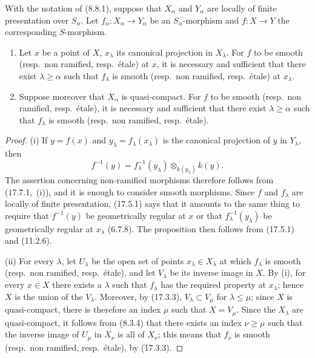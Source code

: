 \begin{proposition}[17.7.8]
\label{IV.17.7.8}
With the notation of (8.8.1), suppose that $X_\alpha$ and $Y_\alpha$ are locally of finite presentation over $S_\alpha$.
Let $f_\alpha:X_\alpha\to Y_\alpha$ be an $S_\alpha$-morphism and $f:X\to Y$ the corresponding $S$-morphism.
\begin{enumerate}[label=(\roman*)]
  \item Let $x$ be a point of $X$, $x_\lambda$ its canonical projection in $X_\lambda$.
  For $f$ to be smooth (resp.\ non ramified, resp.\ \'etale) at $x$, it is necessary and sufficient that there exist $\lambda\geq\alpha$ such that $f_\lambda$ is smooth (resp.\ non ramified, resp.\ \'etale) at $x_\lambda$.
  \item Suppose moreover that $X_\alpha$ is quasi-compact.
  For $f$ to be smooth (resp.\ non ramified, resp.\ \'etale), it is necessary and sufficient that there exist $\lambda\geq\alpha$ such that $f_\lambda$ is smooth (resp.\ non ramified, resp.\ \'etale).
\end{enumerate}
\end{proposition}

\begin{proof}
(i) If $y=f(x)$ and $y_\lambda=f_\lambda(x_\lambda)$ is the canonical projection of $y$ in $Y_\lambda$, then
\[
f^{-1}(y)=f_\lambda^{-1}(y_\lambda)\otimes_{k(y_\lambda)}k(y).
\]
The assertion concerning non-ramified morphisms therefore follows from (17.7.1,~(i)), and it is enough to consider smooth morphisms.
Since $f$ and $f_\lambda$ are locally of finite presentation, (17.5.1) says that it amounts to the same thing to require that $f^{-1}(y)$ be geometrically regular at $x$ or that $f_\lambda^{-1}(y_\lambda)$ be geometrically regular at $x_\lambda$ (6.7.8).
The proposition then follows from (17.5.1) and (11.2.6).

(ii) For every $\lambda$, let $U_\lambda$ be the open set of points $x_\lambda\in X_\lambda$ at which $f_\lambda$ is smooth (resp.\ non ramified, resp.\ \'etale), and let $V_\lambda$ be its inverse image in $X$.
By (i), for every $x\in X$ there exists a $\lambda$ such that $f_\lambda$ has the required property at $x_\lambda$; hence $X$ is the union of the $V_\lambda$.
Moreover, by (17.3.3), $V_\lambda\subset V_\mu$ for $\lambda\leq\mu$; since $X$ is quasi-compact, there is therefore an index $\mu$ such that $X=V_\mu$.
Since the $X_\lambda$ are quasi-compact, it follows from (8.3.4) that there exists an index $\nu\geq\mu$ such that the inverse image of $U_\mu$ in $X_\nu$ is all of $X_\nu$; this means that $f_\nu$ is smooth (resp.\ non ramified, resp.\ \'etale), by (17.3.3).
\end{proof}

